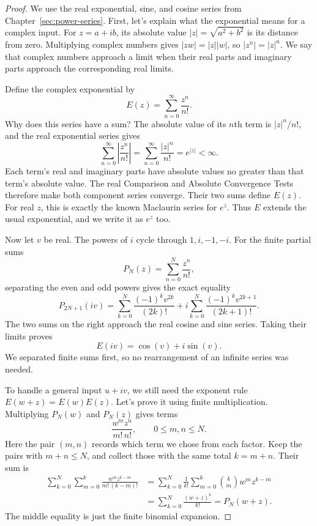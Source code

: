 \begin{proof}
We use the real exponential, sine, and cosine series from
Chapter~\ref{sec:power-series}. First, let's explain what the
exponential means for a complex input.
For $z=a+ib$, its absolute value $|z|=\sqrt{a^2+b^2}$ is its distance
from zero. Multiplying complex numbers gives $|zw|=|z||w|$, so
$|z^n|=|z|^n$. We say that complex numbers approach a limit when their
real parts and imaginary parts approach the corresponding real limits.

Define the complex exponential by
$$E(z)=\sum_{n=0}^{\infty}\frac{z^n}{n!}.$$
Why does this series have a sum? The absolute value of its $n$th term is
$|z|^n/n!$, and the real exponential series gives
$$\sum_{n=0}^{\infty}\left|\frac{z^n}{n!}\right|
=\sum_{n=0}^{\infty}\frac{|z|^n}{n!}=e^{|z|}<\infty.$$
Each term's real and imaginary parts have absolute values no greater
than that term's absolute value. The real Comparison and Absolute
Convergence Tests therefore make both component series converge.
Their two sums define $E(z)$.
For real $z$, this is exactly the known Maclaurin series for $e^z$.
Thus $E$ extends the usual exponential, and we write it as $e^z$ too.

Now let $v$ be real. The powers of $i$ cycle through $1,i,-1,-i$.
For the finite partial sums
$$P_N(z)=\sum_{n=0}^{N}\frac{z^n}{n!},$$
separating the even and odd powers gives the exact equality
$$
P_{2N+1}(iv)
=\sum_{k=0}^{N}\frac{(-1)^kv^{2k}}{(2k)!}
 +i\sum_{k=0}^{N}\frac{(-1)^kv^{2k+1}}{(2k+1)!}.
$$
The two sums on the right approach the real cosine and sine series.
Taking their limits proves
$$E(iv)=\cos(v)+i\sin(v).$$
We separated finite sums first, so no rearrangement of an infinite
series was needed.

To handle a general input $u+iv$, we still need the exponent rule
$E(w+z)=E(w)E(z)$. Let's prove it using finite multiplication.
Multiplying $P_N(w)$ and $P_N(z)$ gives terms
$$\frac{w^m z^n}{m!\,n!},\qquad 0\leq m,n\leq N.$$
Here the pair $(m,n)$ records which term we chose from each factor.
Keep the pairs with $m+n\leq N$, and collect those with the same
total $k=m+n$. Their sum is
\begin{align*}
\sum_{k=0}^{N}\sum_{m=0}^{k}
 \frac{w^m z^{k-m}}{m!\,(k-m)!}
&=\sum_{k=0}^{N}\frac1{k!}
 \sum_{m=0}^{k}{k\choose m}w^m z^{k-m}\\
&=\sum_{k=0}^{N}\frac{(w+z)^k}{k!}=P_N(w+z).
\end{align*}
The middle equality is just the finite binomial expansion.


\end{proof}
